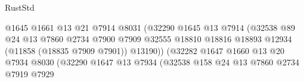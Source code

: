 \begin{lexlean}{RustStd}
\begin{coremodule}
                                                  @1645
                                                  @1661
                                                  @13
                                                  @21
                                                  @7914
                                                  @8031
                                                  (@32290
                                                    @1645
                                                    @13
                                                    @7914
                                                    (@32538
                                                      @89
                                                      @24
                                                      @13
                                                      @7860
                                                      @2734
                                                      @7900
                                                      @7909
                                                      @32555
                                                      @18810
                                                      @18816
                                                      @18893
                                                      @12934
                                                      (@11858 (@18835 @7909 @7901))
                                                      @13190))
                                                  (@32282
                                                    @1647
                                                    @1660
                                                    @13
                                                    @20
                                                    @7934
                                                    @8030
                                                    (@32290
                                                      @1647
                                                      @13
                                                      @7934
                                                      (@32538
                                                        @158
                                                        @24
                                                        @13
                                                        @7860
                                                        @2734
                                                        @7919
                                                        @7929

\end{coremodule}
\end{lexlean}
